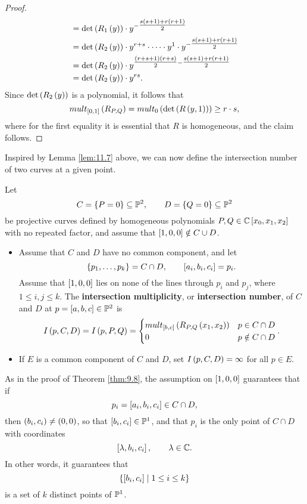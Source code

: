 \begin{proof}
\begin{align*}
& = \det\rb{R_1\rb{y}} \cdot y^{-\tfrac{s\rb{s + 1}+r\rb{r + 1}}{2}} \\
& = \det\rb{R_2\rb{y}} \cdot y^{r + s} \cdot \dots \cdot y^1 \cdot y^{-\tfrac{s\rb{s + 1} + r\rb{r + 1}}{2}} \\
& = \det\rb{R_2\rb{y}} \cdot y^{\tfrac{\rb{r + s + 1}\rb{r + s}}{2} - \tfrac{s\rb{s + 1}+r\rb{r + 1}}{2}} \\
& = \det\rb{R_2\rb{y}} \cdot y^{rs}.
\end{align*}
Since $ \det\rb{R_2\rb{y}} $ is a polynomial, it follows that
$$ mult_{\sb{0, 1}}\rb{R_{P, Q}} = mult_0\rb{\det\rb{R\rb{y, 1}}} \ge r \cdot s, $$
where for the first equality it is essential that $ R $ is homogeneous, and the claim follows.
\end{proof}

Inspired by Lemma \ref{lem:11.7} above, we can now define the intersection number of two curves at a given point.

\begin{definition}
\label{def:11.8}
Let
$$ C = \cb{P = 0} \subseteq \P^2, \qquad D = \cb{Q = 0} \subseteq \P^2 $$
be projective curves defined by homogeneous polynomials $ P, Q \in \C\sb{x_0, x_1, x_2} $ with no repeated factor, and assume that $ \sb{1, 0, 0} \notin C \cup D $.
\begin{itemize}
\item Assume that $ C $ and $ D $ have no common component, and let
$$ \cb{p_1, \dots, p_k} = C \cap D, \qquad \sb{a_i, b_i, c_i} = p_i. $$
Assume that $ \sb{1, 0, 0} $ lies on none of the lines through $ p_i $ and $ p_j $, where $ 1 \le i, j \le k $. The \textbf{intersection multiplicity}, or \textbf{intersection number}, of $ C $ and $ D $ at $ p = \sb{a, b, c} \in \P^2 $ is
$$ I\rb{p, C, D} = I\rb{p, P, Q} =
\begin{cases}
mult_{\sb{b, c}}\rb{R_{P, Q}\rb{x_1, x_2}} & p \in C \cap D \\
0 & p \notin C \cap D
\end{cases}.
$$
\item If $ E $ is a common component of $ C $ and $ D $, set $ I\rb{p, C, D} = \infty $ for all $ p \in E $.
\end{itemize}
\end{definition}

\begin{remark}
As in the proof of Theorem \ref{thm:9.8}, the assumption on $ \sb{1, 0, 0} $ guarantees that if
$$ p_i = \sb{a_i, b_i, c_i} \in C \cap D, $$
then $ \rb{b_i, c_i} \ne \rb{0, 0} $, so that $ \sb{b_i, c_i} \in \P^1 $, and that $ p_i $ is the only point of $ C \cap D $ with coordinates
$$ \sb{\lambda, b_i, c_i}, \qquad \lambda \in \C. $$
In other words, it guarantees that
$$ \cb{\sb{b_i, c_i} \mid 1 \le i \le k} $$
is a set of $ k $ distinct points of $ \P^1 $.
\end{remark}

